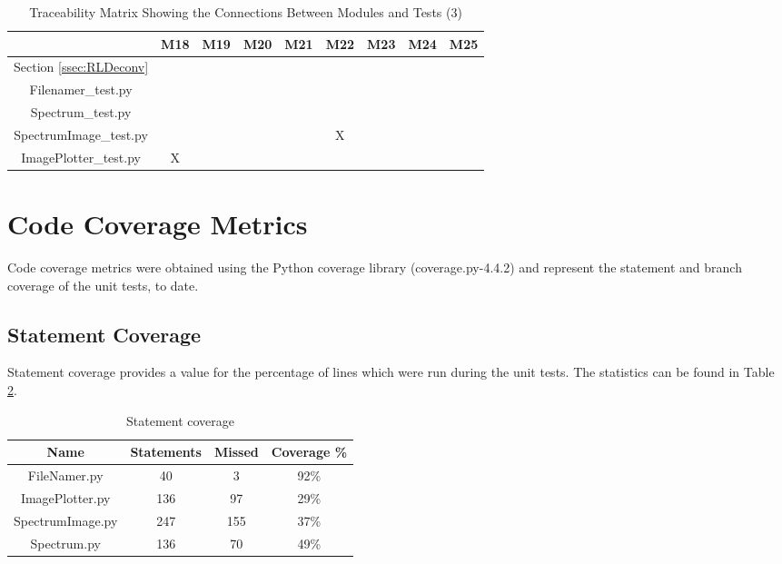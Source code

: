 \documentclass[12pt, titlepage]{article}
\begin{document}
\begin{table}[h!]
    \centering
    \begin{tabular}{|c|c|c|c|c|c|c|c|c|}
        \hline
        & M18 & M19 & M20 & M21 & M22 & M23 & M24 & M25 \\
        \hline
        Section \ref{ssec:RLDeconv} & & & & & & & & \\ \hline
        Filenamer\_test.py & & & & & & & & \\ \hline
        Spectrum\_test.py & & & & & & & & \\ \hline
        SpectrumImage\_test.py & & & & & X &  & & \\ \hline
        ImagePlotter\_test.py & X & & & & &  & & \\ \hline
    \end{tabular}
    \caption{Traceability Matrix Showing the Connections Between Modules and Tests (3)}
    \label{Table:M_trace3}
\end{table}

\section{Code Coverage Metrics}
Code coverage metrics were obtained using the Python coverage library
(coverage.py-4.4.2) and represent the statement and branch coverage of the unit
tests, to date. 

\subsection{Statement Coverage}
Statement coverage provides a value for the percentage of lines which were run
during the unit tests. The statistics can be found in Table \ref{Table:Statementcov}.

\label{ssec:StatCov}
\begin{table}[h!]
    \centering
    \begin{tabular}{|c|c|c|c|}
        \hline
        Name & Statements & Missed & Coverage \%\\
        \hline
        FileNamer.py & 40 & 3 & 92\%\\
        ImagePlotter.py & 136 & 97 & 29\%\\
        SpectrumImage.py & 247 & 155 & 37\%\\
        Spectrum.py & 136 & 70 & 49\%\\
        \hline
    \end{tabular}
    \caption{Statement coverage}
    \label{Table:Statementcov}
\end{table}
\end{document}
